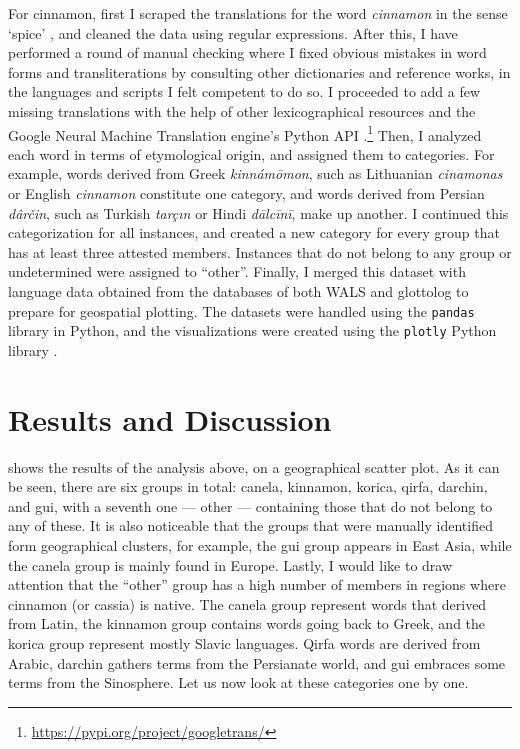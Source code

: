 For cinnamon, first I scraped the translations for the word \textit{cinnamon} in the sense `spice' \parencite{wiktionary_cinnamon_nodate}, and cleaned the data using regular expressions. After this, I have performed a round of manual checking where I fixed obvious mistakes in word forms and transliterations by consulting other dictionaries and reference works, in the languages and scripts I felt competent to do so. I proceeded to add a few missing translations with the help of other lexicographical resources and the Google Neural Machine Translation engine's Python API \parencite{wu_googles_2016}.\footnote{\url{https://pypi.org/project/googletrans/}} Then, I analyzed each word in terms of etymological origin, and assigned them to categories. For example, words derived from Greek \textit{kinnámōmon}, such as Lithuanian \textit{cinamonas} or English \textit{cinnamon} constitute one category, and words derived from Persian \textit{dârčin}, such as Turkish \textit{tarçın} or Hindi \textit{dālcīnī}, make up another. I continued this categorization for all instances, and created a new category for every group that has at least three attested members. Instances that do not belong to any group or undetermined were assigned to ``other''. Finally, I merged this dataset with language data obtained from the databases of both \gls{WALS} \parencite{dryer_wals_2013} and \gls{glottolog} \parencite{hammarstrom_glottolog_2022} to prepare for geospatial plotting. The datasets were handled using the \texttt{pandas} library in Python, and the visualizations were created using the \texttt{plotly} Python library \parencites{pandas, plotly}.

\section{Results and Discussion}

 shows the results of the analysis above, on a geographical scatter plot. As it can be seen, there are six groups in total: canela, kinnamon, korica, qirfa, darchin, and gui, with a seventh one --- other --- containing those that do not belong to any of these. It is also noticeable that the groups that were manually identified form geographical clusters, for example, the gui group appears in East Asia, while the canela group is mainly found in Europe. Lastly, I would like to draw attention that the ``other'' group has a high number of members in regions where cinnamon (or cassia) is native. The canela group represent words that derived from Latin, the kinnamon group contains words going back to Greek, and the korica group represent mostly Slavic languages. Qirfa words are derived from Arabic, darchin gathers terms from the Persianate world, and gui embraces some terms from the Sinosphere. Let us now look at these categories one by one.

